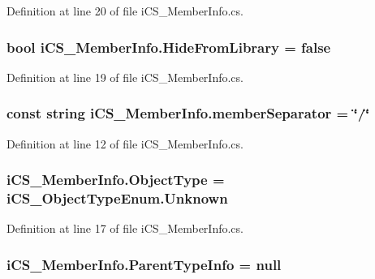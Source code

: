 Definition at line 20 of file i\+C\+S\+\_\+\+Member\+Info.\+cs.

\hypertarget{classi_c_s___member_info_aa91115af96d9f7a09b02ffd513c74901}{
\subsubsection[{Hide\+From\+Library}]{\setlength{\rightskip}{0pt plus 5cm}bool i\+C\+S\+\_\+\+Member\+Info.\+Hide\+From\+Library = false}}\label{classi_c_s___member_info_aa91115af96d9f7a09b02ffd513c74901}


Definition at line 19 of file i\+C\+S\+\_\+\+Member\+Info.\+cs.

\hypertarget{classi_c_s___member_info_a878d9c2898871ac407c9e48b367772bb}{
\subsubsection[{member\+Separator}]{\setlength{\rightskip}{0pt plus 5cm}const string i\+C\+S\+\_\+\+Member\+Info.\+member\+Separator = \char`\"{}/\char`\"{}}}\label{classi_c_s___member_info_a878d9c2898871ac407c9e48b367772bb}


Definition at line 12 of file i\+C\+S\+\_\+\+Member\+Info.\+cs.

\hypertarget{classi_c_s___member_info_afd6682db43a328751174d1b09c76aa20}{
\subsubsection[{Object\+Type}]{ i\+C\+S\+\_\+\+Member\+Info.\+Object\+Type = {\bf i\+C\+S\+\_\+\+Object\+Type\+Enum.\+Unknown}}}\label{classi_c_s___member_info_afd6682db43a328751174d1b09c76aa20}


Definition at line 17 of file i\+C\+S\+\_\+\+Member\+Info.\+cs.

\hypertarget{classi_c_s___member_info_a0c2771e3cd95afd78296f6f43391dfa8}{
\subsubsection[{Parent\+Type\+Info}]{ i\+C\+S\+\_\+\+Member\+Info.\+Parent\+Type\+Info = null}}\label{classi_c_s___member_info_a0c2771e3cd95afd78296f6f43391dfa8}


